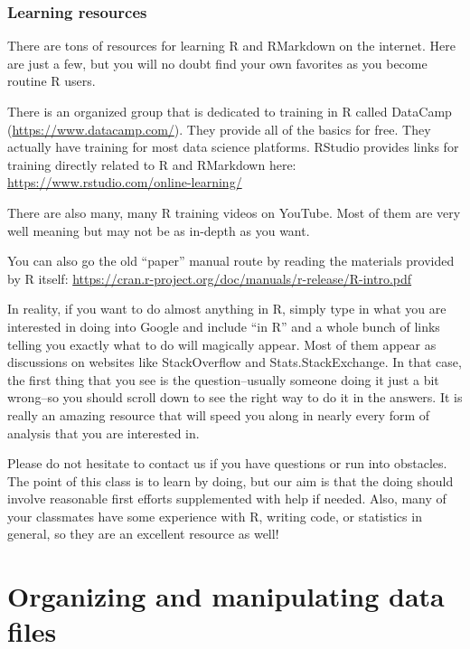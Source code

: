 \documentclass[]{book}
\begin{document}
\hypertarget{learning-resources}{%
\subsection{Learning resources}\label{learning-resources}}

There are tons of resources for learning R and RMarkdown on the internet. Here are just a few, but you will no doubt find your own favorites as you become routine R users.

There is an organized group that is dedicated to training in R called DataCamp (\url{https://www.datacamp.com/}). They provide all of the basics for free. They actually have training for most data science platforms. RStudio provides links for training directly related to R and RMarkdown here:
\url{https://www.rstudio.com/online-learning/}

There are also many, many R training videos on YouTube. Most of them are very well meaning but may not be as in-depth as you want.

You can also go the old ``paper'' manual route by reading the materials provided by R itself:
\url{https://cran.r-project.org/doc/manuals/r-release/R-intro.pdf}

In reality, if you want to do almost anything in R, simply type in what you are interested in doing into Google and include ``in R'' and a whole bunch of links telling you exactly what to do will magically appear. Most of them appear as discussions on websites like StackOverflow and Stats.StackExchange. In that case, the first thing that you see is the question--usually someone doing it just a bit wrong--so you should scroll down to see the right way to do it in the answers. It is really an amazing resource that will speed you along in nearly every form of analysis that you are interested in.

Please do not hesitate to contact us if you have questions or run into obstacles. The point of this class is to learn by doing, but our aim is that the doing should involve reasonable first efforts supplemented with help if needed. Also, many of your classmates have some experience with R, writing code, or statistics in general, so they are an excellent resource as well!

\hypertarget{organizing-and-manipulating-data-files}{%
\chapter{Organizing and manipulating data files}\label{organizing-and-manipulating-data-files}}
\end{document}
